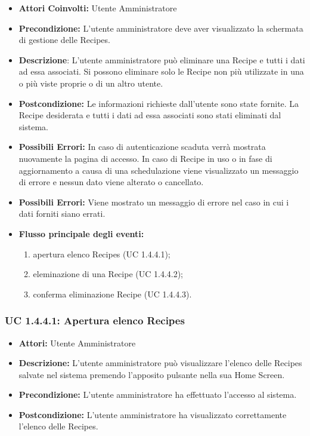 \begin{itemize}
    \item \textbf{Attori Coinvolti:}
    Utente Amministratore

    \item \textbf{Precondizione:}
    L'utente amministratore deve aver visualizzato la schermata di gestione delle Recipes.

    \item \textbf{Descrizione}:
    L'utente amministratore può eliminare una Recipe e tutti i dati ad essa associati.
    Si possono eliminare solo le Recipe non più utilizzate in una o più viste proprie o di un altro utente.

    \item \textbf{Postcondizione:}
    Le informazioni richieste dall'utente sono state fornite.
    La Recipe desiderata e tutti i dati ad essa associati sono stati eliminati dal sistema.

    \item \textbf{Possibili Errori:}
    In caso di autenticazione scaduta verrà mostrata nuovamente la pagina di accesso.
    In caso di Recipe in uso o in fase di aggiornamento a causa di una schedulazione viene visualizzato un messaggio di errore e nessun dato viene alterato o cancellato.
	\item \textbf{Possibili Errori:}
    Viene mostrato un messaggio di errore nel caso in cui i dati forniti siano errati.
    \item \textbf{Flusso principale degli eventi:}

    \begin{enumerate}
        \item apertura elenco Recipes (UC 1.4.4.1);
        \item eleminazione di una Recipe (UC 1.4.4.2);
        \item conferma eliminazione Recipe (UC 1.4.4.3).
    \end{enumerate}

\end{itemize}

\subsubsection{UC 1.4.4.1: Apertura elenco Recipes}

\begin{itemize}
    \item \textbf{Attori:} Utente Amministratore
    \item \textbf{Descrizione:} L'utente amministratore può visualizzare l'elenco delle Recipes salvate nel sistema premendo l'apposito pulsante nella sua Home Screen.
    \item \textbf{Precondizione:} L'utente amministratore ha effettuato l'accesso al sistema.
    \item \textbf{Postcondizione:} L'utente amministratore ha visualizzato correttamente l'elenco delle Recipes.
\end{itemize}

